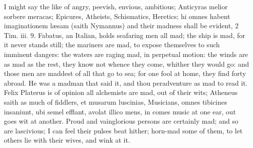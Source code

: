 {I might say the like of angry, peevish, envious, ambitious; 
Anticyras melior sorbere meracas; Epicures, Atheists, Schismatics,
Heretics; hi omnes habent imaginationem l\ae{}sam (saith Nymannus) and
their madness shall be evident, 2 Tim. iii. 9. Fabatus, an
Italian, holds seafaring men all mad; the ship is mad, for it never
stands still; the mariners are mad, to expose themselves to such
imminent dangers: the waters are raging mad, in perpetual motion: the
winds are as mad as the rest, they know not whence they come, whither
they would go: and those men are maddest of all that go to sea; for one
fool at home, they find forty abroad. He was a madman that said it, and
thou peradventure as mad to read it.  Felix Platerus is of opinion
all alchemists are mad, out of their wits; Atheneus saith as much
of fiddlers, et musarum luscinias,  Musicians, omnes tibicines
insaniunt, ubi semel efflant, avolat illico mens, in comes music at one
ear, out goes wit at another. Proud and vainglorious persons are
certainly mad; and so are lascivious; I can feel their pulses beat
hither; horn-mad some of them, to let others lie with their wives, and
wink at it.

}
